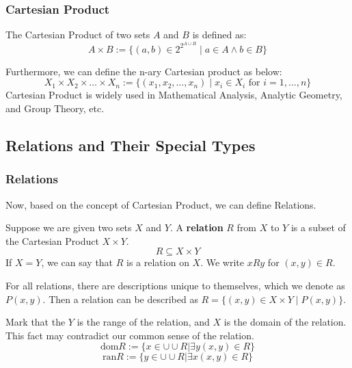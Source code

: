 \subsubsection{Cartesian Product}
\begin{definition}
The Cartesian Product of two sets $A$ and $B$ is defined as:
$$ A \times B := \{ (a,b) \in 2^{2^{A \cup B}} \mid a \in A \wedge b \in B \} $$
\end{definition}
Furthermore, we can define the n-ary Cartesian product as below:
$$ X_1 \times X_2 \times \dots \times X_n := \{ (x_1, x_2, \dots, x_n) \mid x_i \in X_i \text{ for } i=1, \dots, n \} $$
Cartesian Product is widely used in Mathematical Analysis, Analytic Geometry, and Group Theory, etc.

\subsection{Relations and Their Special Types}

\subsubsection{Relations}
Now, based on the concept of Cartesian Product, we can define Relations.
\begin{definition}[Relation]
Suppose we are given two sets $X$ and $Y$. A \textbf{relation} $R$ from $X$ to $Y$ is a subset of the Cartesian Product $X \times Y$.
$$ R \subseteq X \times Y $$
If $X=Y$, we can say that $R$ is a relation on $X$. We write $xRy$ for $(x,y) \in R$.
\end{definition}
For all relations, there are descriptions unique to themselves, which we denote as $P(x,y)$. Then a relation can be described as $R = \{ (x,y) \in X \times Y \mid P(x,y) \}$.

\begin{remark}
Mark that the $Y$ is the range of the relation, and $X$ is the domain of the relation. This fact may contradict our common sense of the relation.
\[
\text{dom}R:=\{x \in \cup \cup R| \exists y (x,y) \in R\}
\]
\[
\text{ran}R:=\{y\in \cup \cup R| \exists x(x,y) \in R\}
\]
\end{remark}

